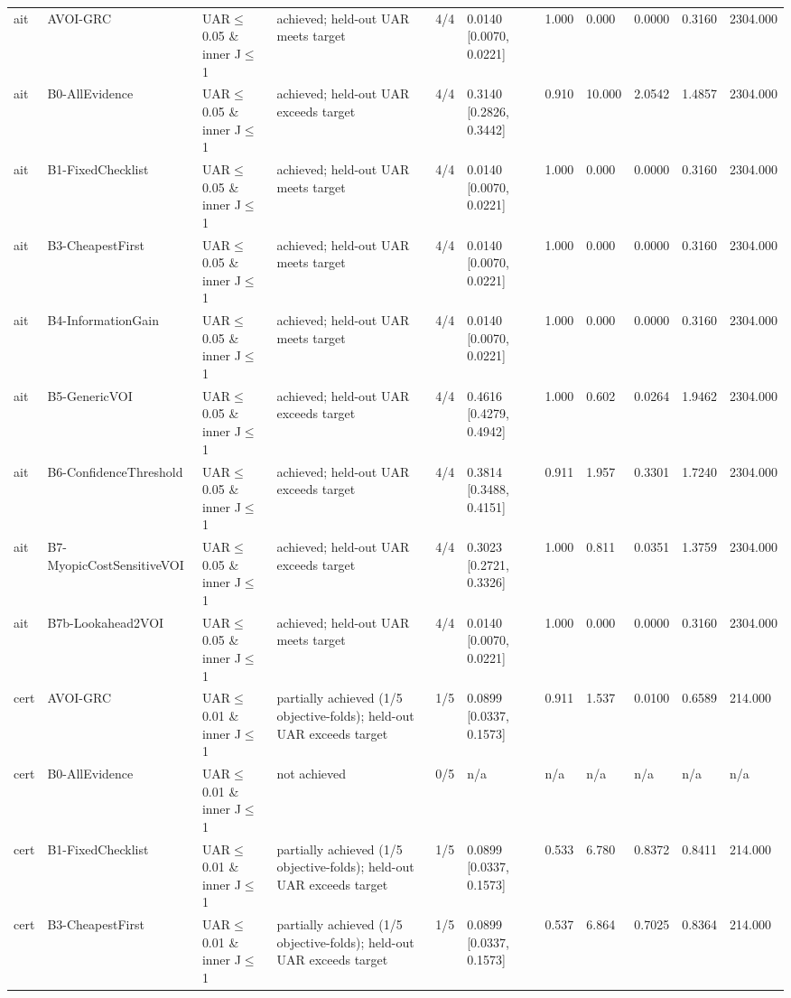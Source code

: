 \begin{table}[!ht]
{\begin{tabular}{lllllllllll}
ait & AVOI-GRC & UAR$\le$0.05 \& inner J$\le$1 & achieved; held-out UAR meets target & 4/4 & 0.0140 [0.0070, 0.0221] & 1.000 & 0.000 & 0.0000 & 0.3160 & 2304.000 \\
ait & B0-AllEvidence & UAR$\le$0.05 \& inner J$\le$1 & achieved; held-out UAR exceeds target & 4/4 & 0.3140 [0.2826, 0.3442] & 0.910 & 10.000 & 2.0542 & 1.4857 & 2304.000 \\
ait & B1-FixedChecklist & UAR$\le$0.05 \& inner J$\le$1 & achieved; held-out UAR meets target & 4/4 & 0.0140 [0.0070, 0.0221] & 1.000 & 0.000 & 0.0000 & 0.3160 & 2304.000 \\
ait & B3-CheapestFirst & UAR$\le$0.05 \& inner J$\le$1 & achieved; held-out UAR meets target & 4/4 & 0.0140 [0.0070, 0.0221] & 1.000 & 0.000 & 0.0000 & 0.3160 & 2304.000 \\
ait & B4-InformationGain & UAR$\le$0.05 \& inner J$\le$1 & achieved; held-out UAR meets target & 4/4 & 0.0140 [0.0070, 0.0221] & 1.000 & 0.000 & 0.0000 & 0.3160 & 2304.000 \\
ait & B5-GenericVOI & UAR$\le$0.05 \& inner J$\le$1 & achieved; held-out UAR exceeds target & 4/4 & 0.4616 [0.4279, 0.4942] & 1.000 & 0.602 & 0.0264 & 1.9462 & 2304.000 \\
ait & B6-ConfidenceThreshold & UAR$\le$0.05 \& inner J$\le$1 & achieved; held-out UAR exceeds target & 4/4 & 0.3814 [0.3488, 0.4151] & 0.911 & 1.957 & 0.3301 & 1.7240 & 2304.000 \\
ait & B7-MyopicCostSensitiveVOI & UAR$\le$0.05 \& inner J$\le$1 & achieved; held-out UAR exceeds target & 4/4 & 0.3023 [0.2721, 0.3326] & 1.000 & 0.811 & 0.0351 & 1.3759 & 2304.000 \\
ait & B7b-Lookahead2VOI & UAR$\le$0.05 \& inner J$\le$1 & achieved; held-out UAR meets target & 4/4 & 0.0140 [0.0070, 0.0221] & 1.000 & 0.000 & 0.0000 & 0.3160 & 2304.000 \\
cert & AVOI-GRC & UAR$\le$0.01 \& inner J$\le$1 & partially achieved (1/5 objective-folds); held-out UAR exceeds target & 1/5 & 0.0899 [0.0337, 0.1573] & 0.911 & 1.537 & 0.0100 & 0.6589 & 214.000 \\
cert & B0-AllEvidence & UAR$\le$0.01 \& inner J$\le$1 & not achieved & 0/5 & n/a & n/a & n/a & n/a & n/a & n/a \\
cert & B1-FixedChecklist & UAR$\le$0.01 \& inner J$\le$1 & partially achieved (1/5 objective-folds); held-out UAR exceeds target & 1/5 & 0.0899 [0.0337, 0.1573] & 0.533 & 6.780 & 0.8372 & 0.8411 & 214.000 \\
cert & B3-CheapestFirst & UAR$\le$0.01 \& inner J$\le$1 & partially achieved (1/5 objective-folds); held-out UAR exceeds target & 1/5 & 0.0899 [0.0337, 0.1573] & 0.537 & 6.864 & 0.7025 & 0.8364 & 214.000 \\

\end{tabular}}
\end{table}
